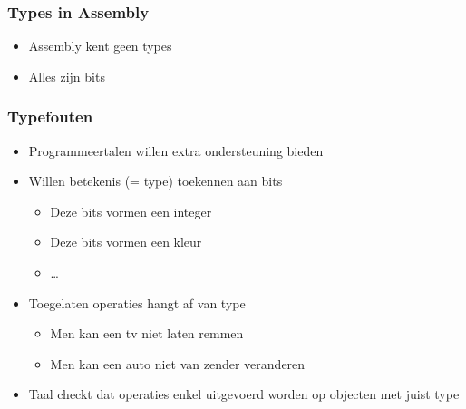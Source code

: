 \begin{frame}
  \frametitle{Types in Assembly}
  \begin{itemize}
    \item Assembly kent geen types
    \item Alles zijn bits
  \end{itemize}
\end{frame}

\begin{frame}
  \frametitle{Typefouten}
  \begin{itemize}
    \item Programmeertalen willen extra ondersteuning bieden
    \item Willen betekenis (= type) toekennen aan bits
          \begin{itemize}
            \item Deze bits vormen een integer
            \item Deze bits vormen een kleur
            \item \dots
          \end{itemize}
    \item Toegelaten operaties hangt af van type
          \begin{itemize}
            \item Men kan een tv niet laten remmen
            \item Men kan een auto niet van zender veranderen
          \end{itemize}
    \item Taal checkt dat operaties enkel uitgevoerd worden op objecten met juist type
  \end{itemize}
\end{frame}

